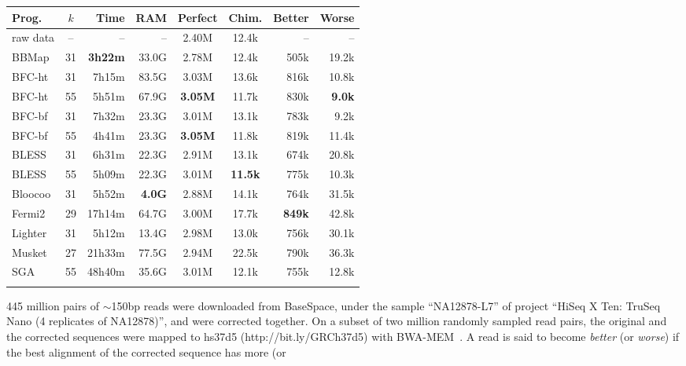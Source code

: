 \documentclass{bioinfo}
\begin{document}
\begin{table}[t]
{\footnotesize
\begin{tabular}{lcrrccrr}
\toprule
Prog.     & $k$ & Time  & RAM   & Perfect&Chim.& Better & Worse \\
\midrule
raw data  & --  & --    & --    & 2.40M  & 12.4k  & --     & -- \\
BBMap     & 31  &{\bf 3h22m}&33.0G& 2.78M& 12.4k  & 505k   & 19.2k \\
BFC-ht    & 31  & 7h15m & 83.5G & 3.03M  &13.6k   & 816k   & 10.8k \\
BFC-ht    & 55  & 5h51m & 67.9G &{\bf 3.05M}&11.7k& 830k   &{\bf 9.0k}\\
BFC-bf    & 31  & 7h32m & 23.3G & 3.01M  & 13.1k  & 783k   & 9.2k \\
BFC-bf    & 55  & 4h41m & 23.3G &{\bf 3.05M}&11.8k& 819k   & 11.4k \\
BLESS     & 31  & 6h31m & 22.3G & 2.91M  & 13.1k  & 674k   & 20.8k \\
BLESS     & 55  & 5h09m & 22.3G & 3.01M  &{\bf 11.5k}& 775k& 10.3k \\
Bloocoo   & 31  & 5h52m &{\bf 4.0G}&2.88M& 14.1k  & 764k   & 31.5k  \\
Fermi2    & 29  &17h14m & 64.7G & 3.00M  & 17.7k  &{\bf 849k}&42.8k \\
Lighter   & 31  & 5h12m & 13.4G & 2.98M  & 13.0k  & 756k   & 30.1k  \\
Musket    & 27  &21h33m & 77.5G & 2.94M  & 22.5k  & 790k   & 36.3k  \\
SGA       & 55  &48h40m & 35.6G & 3.01M  & 12.1k  & 755k   & 12.8k  \\
\botrule
\end{tabular}}{445 million pairs of $\sim$150bp reads were downloaded from
BaseSpace, under the sample ``NA12878-L7'' of project ``HiSeq X Ten: TruSeq
Nano (4 replicates of NA12878)'', and were corrected together. On a subset of
two million randomly sampled read pairs, the original and the corrected
sequences were mapped to hs37d5 (http://bit.ly/GRCh37d5) with
BWA-MEM~\citep{Li:2013aa}.  A read is said to become \emph{better} (or
\emph{worse}) if the best alignment of the corrected sequence has more (or
}
\end{table}
\end{document}
